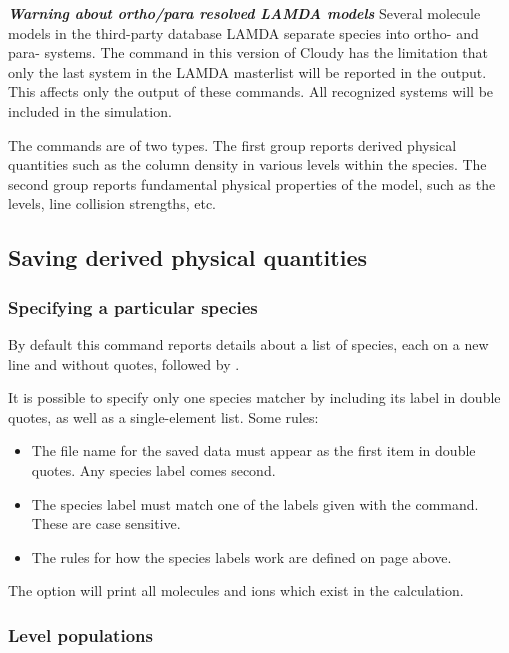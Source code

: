 \textbf{\textit{Warning about ortho/para resolved LAMDA models}}
Several molecule models in the third-party database LAMDA separate species 
into ortho- and para- systems.  
The   command in this version of Cloudy has the limitation that 
only the last system in the LAMDA masterlist will be reported in the output.
This affects only the output of these commands.
All recognized systems will be included in the simulation.

The  commands are of two types.
The first group reports derived physical quantities such as the column density
in various levels within the species.
The second group reports fundamental physical properties of the model,
such as the levels, line collision strengths, etc.

\subsection{Saving derived physical quantities}
\label{sec:SaveSpeciesDerived}

\subsubsection{Specifying a particular species}
By default this command 
reports details about a list of species, each
on a new line and without quotes, followed by .

It is possible to specify only one species matcher by including its
label in double quotes, as well as a single-element list.  Some
rules:
\begin{itemize}
  \item The file name for the saved data must appear as the first
  item in double quotes.  Any species label comes second.
  \item The species label must match one of the labels 
  given with the  command.
  These are case sensitive.
  \item The rules for how the species labels work are defined on 
  page \pageref{sec:SpeciesDefine} above.
\end{itemize}

The  option will print all molecules and ions which exist
in the calculation.

\subsubsection{Level populations}
\label{sec:SaveSpeciesLevelPopulations}


